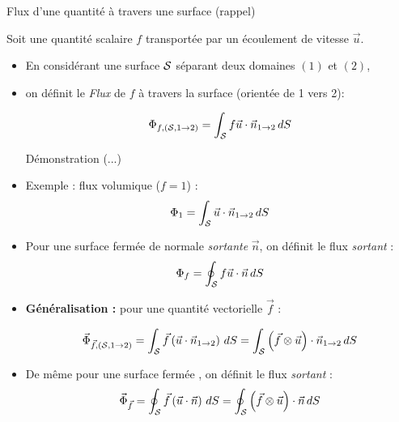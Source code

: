 \begin{frame}{Flux d'une quantité à travers une surface (rappel)}

\small

Soit une quantité scalaire $f$  transportée par un écoulement de vitesse $\vec{u}$.
\smallskip

\begin{itemize}

\item En considérant une surface $\cal S$ séparant deux domaines $(1)$ et $(2)$,

\smallskip

\item[] on définit le {\em Flux} de $f$ à travers la surface (orientée de 1 vers 2):

$$
\Phi_{f,  ({\cal S}, 1 \rightarrow 2)} = \int_{\cal S} f \vec{u} \cdot  \vec {n}_{1\rightarrow 2} \, dS
$$

{\color{vert} Démonstration (...)} 

\pause 
\medskip

\pause
\medskip
\item Exemple : flux volumique ($f=1$) :
$$
\Phi_1 =  \int_{\cal S} \vec{u} \cdot  \vec {n}_{1\rightarrow 2} \, dS
$$

\item Pour une surface fermée de normale {\em sortante} $\vec{n}$, on définit le flux {\em sortant} :
$$
\Phi_{f} = \oint_{\cal S} f \vec{u} \cdot  \vec {n} \, dS
$$




\pause
\bigskip

\item {\bf Généralisation : } pour une quantité vectorielle $\vec{f}$ :
 
$$
\vec{\Phi}_{\vec{f},  ({\cal S}, 1 \rightarrow 2)} = \int_{\cal S} \vec{f} \left( \vec{u} \cdot  \vec {n}_{1\rightarrow 2} \right) \, dS
= \int_{\cal S} \left( \vec{f} \otimes \vec{u} \right) \cdot  \vec {n}_{1\rightarrow 2} \, dS
$$


\pause
\medskip
\item De même pour une surface fermée , on définit le flux {\em sortant} :
$$
\vec{\Phi}_{\vec{f}} = \oint_{\cal S} \vec{f} \left( \vec{u} \cdot  \vec {n} \right)\, dS
= \oint_{\cal S} \left( \vec{f} \otimes \vec{u} \right) \cdot  \vec {n} \, dS
$$

\end{itemize}
\end{frame}



